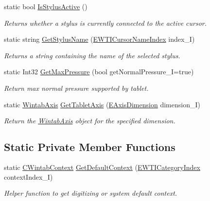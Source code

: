 \begin{DoxyCompactItemize}
static bool \mbox{\hyperlink{class_wintab_d_n_1_1_c_wintab_info_ad7f57161542bff690ae05fe4e0eef36f}{Is\+Stylus\+Active}} ()
\begin{DoxyCompactList}\small\item\em Returns whether a stylus is currently connected to the active cursor. \end{DoxyCompactList}\item 
static string \mbox{\hyperlink{class_wintab_d_n_1_1_c_wintab_info_a6ad2f1350b2b5b447dd428f509892d14}{Get\+Stylus\+Name}} (\mbox{\hyperlink{namespace_wintab_d_n_a54fdc0e52106effb073b35f8f6b3920a}{E\+W\+T\+I\+Cursor\+Name\+Index}} index\+\_\+I)
\begin{DoxyCompactList}\small\item\em Returns a string containing the name of the selected stylus. \end{DoxyCompactList}\item 
static Int32 \mbox{\hyperlink{class_wintab_d_n_1_1_c_wintab_info_a8e30cbae3a0def0ca807d7b9758484bd}{Get\+Max\+Pressure}} (bool get\+Normal\+Pressure\+\_\+I=true)
\begin{DoxyCompactList}\small\item\em Return max normal pressure supported by tablet. \end{DoxyCompactList}\item 
static \mbox{\hyperlink{struct_wintab_d_n_1_1_wintab_axis}{Wintab\+Axis}} \mbox{\hyperlink{class_wintab_d_n_1_1_c_wintab_info_a2ec0c06074db048531e4de218c5e3755}{Get\+Tablet\+Axis}} (\mbox{\hyperlink{namespace_wintab_d_n_a38705aa38c49c04846399172fa9fd1cd}{E\+Axis\+Dimension}} dimension\+\_\+I)
\begin{DoxyCompactList}\small\item\em Return the \mbox{\hyperlink{struct_wintab_d_n_1_1_wintab_axis}{Wintab\+Axis}} object for the specified dimension. \end{DoxyCompactList}\end{DoxyCompactItemize}
\subsection*{Static Private Member Functions}
\begin{DoxyCompactItemize}
\item 
static \mbox{\hyperlink{class_wintab_d_n_1_1_c_wintab_context}{C\+Wintab\+Context}} \mbox{\hyperlink{class_wintab_d_n_1_1_c_wintab_info_ae86f7d8d0acf12b0ebd3cd25cb24e6c2}{Get\+Default\+Context}} (\mbox{\hyperlink{namespace_wintab_d_n_aeb27579e91c95fb5a7bf4a4a9dc7f875}{E\+W\+T\+I\+Category\+Index}} context\+Index\+\_\+I)
\begin{DoxyCompactList}\small\item\em Helper function to get digitizing or system default context. \end{DoxyCompactList}\end{DoxyCompactItemize}
